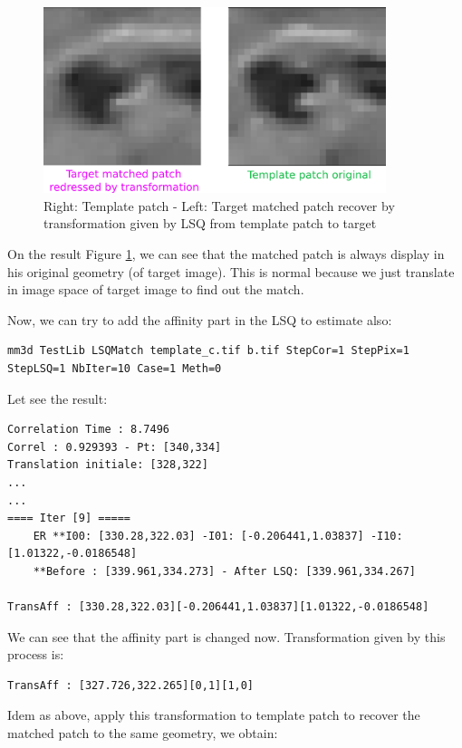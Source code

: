 \documentclass[twoside]{article}
\begin{document}
\begin{figure}[h] 
\centering
\includegraphics[width=10cm]{match_target_Trs.png}
\caption{Right: Template patch - Left: Target matched patch recover by transformation given by LSQ from template patch to target}
\label{fig:2.4}
\centering
\end{figure}

On the result Figure \ref{fig:2.4}, we can see that the matched patch is always display in his original geometry (of target image). This is normal because we just translate in image space of target image to find out the match.

Now, we can try to add the affinity part in the LSQ to estimate also:

\begin{verbatim}
mm3d TestLib LSQMatch template_c.tif b.tif StepCor=1 StepPix=1 StepLSQ=1 NbIter=10 Case=1 Meth=0
\end{verbatim}

Let see the result:
\begin{verbatim}
Correlation Time : 8.7496
Correl : 0.929393 - Pt: [340,334]
Translation initiale: [328,322]
...
...
==== Iter [9] =====
    ER **I00: [330.28,322.03] -I01: [-0.206441,1.03837] -I10: [1.01322,-0.0186548]
    **Before : [339.961,334.273] - After LSQ: [339.961,334.267]

TransAff : [330.28,322.03][-0.206441,1.03837][1.01322,-0.0186548]
\end{verbatim}

We can see that the affinity part is changed now. Transformation given by this process is:
\begin{verbatim}
TransAff : [327.726,322.265][0,1][1,0]
\end{verbatim}

Idem as above, apply this transformation to template patch to recover the matched patch to the same geometry, we obtain:
\end{document}
